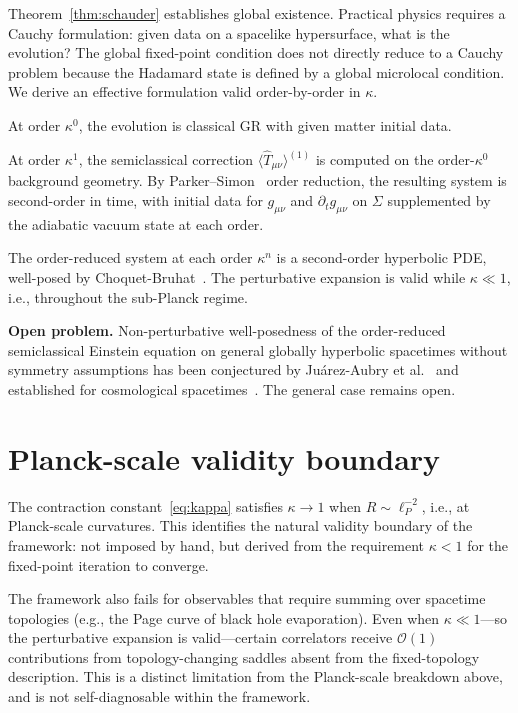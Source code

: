 \documentclass[12pt,a4paper]{article}
\begin{document}
Theorem~\ref{thm:schauder} establishes global existence. Practical physics requires a
Cauchy formulation: given data on a spacelike hypersurface, what is the evolution? The
global fixed-point condition does not directly reduce to a Cauchy problem because the
Hadamard state is defined by a global microlocal condition. We derive an effective
formulation valid order-by-order in $\kappa$.

At order $\kappa^0$, the evolution is classical GR with given matter initial data.

At order $\kappa^1$, the semiclassical correction $\langle\hat{T}_{\mu\nu}\rangle^{(1)}$
is computed on the order-$\kappa^0$ background geometry. By Parker--Simon~\cite{parker_simon}
order reduction, the resulting system is second-order in time, with initial data for
$g_{\mu\nu}$ and $\partial_t g_{\mu\nu}$ on $\Sigma$ supplemented by the adiabatic vacuum
state at each order.

The order-reduced system at each order $\kappa^n$ is a second-order hyperbolic PDE,
well-posed by Choquet-Bruhat~\cite{choquet_bruhat}. The perturbative expansion is valid
while $\kappa \ll 1$, i.e., throughout the sub-Planck regime.

\noindent\textbf{Open problem.} Non-perturbative well-posedness of the order-reduced
semiclassical Einstein equation on general globally hyperbolic spacetimes without symmetry
assumptions has been conjectured by Ju\'arez-Aubry et al.~\cite{juarez_aubry} and
established for cosmological spacetimes~\cite{pinamonti_siemssen}. The general case
remains open.

\section{Planck-scale validity boundary}
\label{sec:planck}

The contraction constant~\eqref{eq:kappa} satisfies $\kappa \to 1$ when
$R \sim \ell_P^{-2}$, i.e., at Planck-scale curvatures. This identifies the natural
validity boundary of the framework: not imposed by hand, but derived from the requirement
$\kappa < 1$ for the fixed-point iteration to converge.

The framework also fails for observables that require summing over spacetime topologies
(e.g., the Page curve of black hole evaporation). Even when $\kappa \ll 1$---so the
perturbative expansion is valid---certain correlators receive $\mathcal{O}(1)$
contributions from topology-changing saddles absent from the fixed-topology
description. This is a distinct limitation from the Planck-scale breakdown above, and is
not self-diagnosable within the framework.
\end{document}
